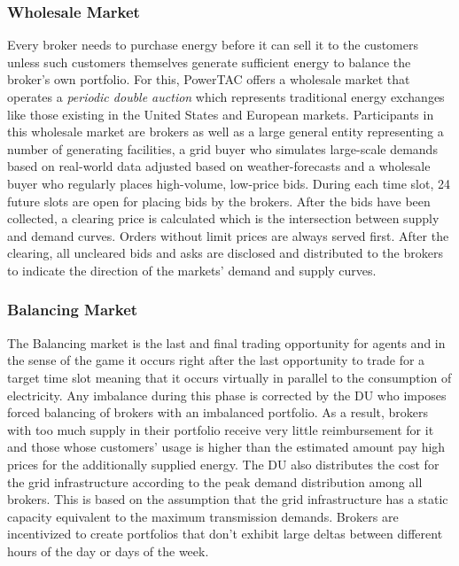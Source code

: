 \subsubsection{Wholesale Market}
Every broker needs to purchase energy before it can sell it to the customers unless such customers themselves
generate sufficient energy to balance the broker's own portfolio. For this, \ac{PowerTAC} offers a wholesale market that operates
a \emph{periodic double auction} which represents traditional energy exchanges like those existing in the United States
and European markets. Participants in this wholesale market are brokers as well as a large general entity
representing a number of generating facilities, a grid buyer who simulates large-scale demands based on real-world data
adjusted based on weather-forecasts and a wholesale buyer who regularly places high-volume, low-price bids. During each
time slot, 24 future slots are open for placing bids by the brokers. After the bids have been collected, a clearing
price is calculated which is the intersection between supply and demand curves. Orders without limit prices are
always served first. After the clearing, all uncleared bids and asks are disclosed and distributed to the brokers to indicate the
direction of the markets' demand and supply curves.

\subsubsection{Balancing Market}
The Balancing market is the last and final trading opportunity for agents and in the
sense of the game it occurs right after the last opportunity to trade for a target time slot meaning that it occurs
virtually in parallel to the consumption of electricity. Any imbalance during this phase is corrected by the \ac{DU} who
imposes forced balancing of brokers with an imbalanced portfolio. As a
result, brokers with too much supply in their portfolio receive very little reimbursement for it and those whose customers' usage is higher than the estimated amount pay
high prices for the additionally supplied energy. The \ac{DU} also distributes the cost for the grid infrastructure
according to the peak demand distribution among all brokers. This is based on the assumption that the grid
infrastructure has a static capacity equivalent to the maximum
transmission demands. Brokers are incentivized to create portfolios that don't exhibit large deltas between
different hours of the day or days of the week.

